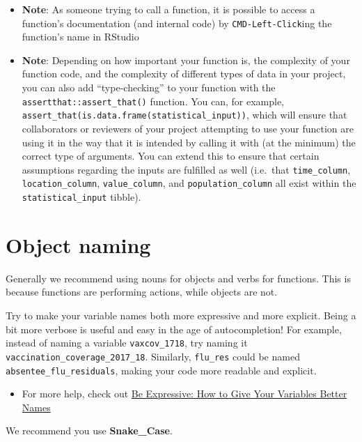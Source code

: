\documentclass[
]{book}
\providecommand{\tightlist}{%
  \setlength{\itemsep}{0pt}\setlength{\parskip}{0pt}}
\begin{document}
\begin{itemize}
\item
  \textbf{Note}: As someone trying to call a function, it is possible to access a function's documentation (and internal code) by \texttt{CMD-Left-Click}ing the function's name in RStudio
\item
  \textbf{Note}: Depending on how important your function is, the complexity of your function code, and the complexity of different types of data in your project, you can also add ``type-checking'' to your function with the \texttt{assertthat::assert\_that()} function. You can, for example, \texttt{assert\_that(is.data.frame(statistical\_input))}, which will ensure that collaborators or reviewers of your project attempting to use your function are using it in the way that it is intended by calling it with (at the minimum) the correct type of arguments. You can extend this to ensure that certain assumptions regarding the inputs are fulfilled as well (i.e.~that \texttt{time\_column}, \texttt{location\_column}, \texttt{value\_column}, and \texttt{population\_column} all exist within the \texttt{statistical\_input} tibble).
\end{itemize}

\hypertarget{object-naming}{%
\section{Object naming}\label{object-naming}}

Generally we recommend using nouns for objects and verbs for functions. This is because functions are performing actions, while objects are not.

Try to make your variable names both more expressive and more explicit. Being a bit more verbose is useful and easy in the age of autocompletion! For example, instead of naming a variable \texttt{vaxcov\_1718}, try naming it \texttt{vaccination\_coverage\_2017\_18}. Similarly, \texttt{flu\_res} could be named \texttt{absentee\_flu\_residuals}, making your code more readable and explicit.

\begin{itemize}
\tightlist
\item
  For more help, check out \href{https://spin.atomicobject.com/2017/11/01/good-variable-names/}{Be Expressive: How to Give Your Variables Better Names}
\end{itemize}

We recommend you use \textbf{Snake\_Case}.
\end{document}
